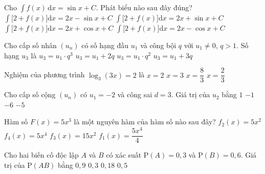\begin{ex}%
	Cho $\displaystyle	\int f(x)\mathrm{\,d} x=\sin x+C$. Phát biểu nào sau đây đúng?
	\choice
		{$\displaystyle\int\big[2+f(x)\big]\mathrm{d} x=2x-\sin x+C$}
		{\True $\displaystyle\int\big[2+f(x)\big]\mathrm{d} x=2x+\sin x+C$}
		{$\displaystyle\int\big[2+f(x)\big]\mathrm{d} x=2x+\cos x+C$}
		{$\displaystyle\int\big[2+f(x)\big]\mathrm{d} x=2x-\cos x+C$}
\end{ex}

\begin{ex}%
	Cho cấp số nhân $(u_n)$ có số hạng đầu $u_1$ và công bội $q$ với $u_1\ne 0$, $q>1$. Số hạng $u_3$ là
	\choice
		{$u_3=u_1\cdot q^3$}
		{$u_3=u_1+2q$}
		{\True $u_3=u_1\cdot q^2$}
		{$u_3=u_1+3q$}
\end{ex}

\begin{ex}%
	Nghiệm của phương trình	$\log_3(3x)=2$ là
	\choice
		{$x=2$}
		{\True $x=3$}
		{$x=\dfrac{8}{3}$}
		{$x=\dfrac{2}{3}$}
\end{ex}

\begin{ex}%
	Cho cấp số cộng $(u_n)$ có $u_1=-2$ và công sai $d=3$. Giá trị của $u_2$ bằng
	\choice
		{\True $1$}
		{$-1$}
		{$-6$}
		{$-5$}
\end{ex}

\begin{ex}%
	Hàm số $F(x)=5x^3$ là một nguyên hàm của hàm số nào sau đây?
	\choice
		{$f_2(x)=5x^2$}
		{$f_4(x)=5x^4$}
		{\True $f_3(x)=15x^2$}
		{$f_1(x)=\dfrac{5x^4}{4}$}
\end{ex}

\begin{ex}%
	Cho hai biến cố độc lập $A$ và $B$ có xác suất $\mathrm{P}(A)=0{,}3$ và $\mathrm{P}(B)=0{,}6$.	Giá trị của $\mathrm{P}(AB)$ bằng
	\choice
		{$0{,}9$}
		{$0{,}3$}
		{\True $0{,}18$}
		{$0{,}5$}
\end{ex}


